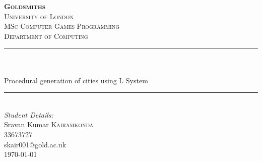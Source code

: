 \begin{titlepage}

\newcommand{\HRule}{\rule{\linewidth}{0.5mm}} %

\center %

\vspace*{\fill}\begin{center}
 
\textsc{\Huge \textbf {Goldsmiths}}\\ %
\textsc{\small University of London}\\[1.5cm] %
\textsc{\Large MSc Computer Games Programming}\\[0.5cm] %
\textsc{\large Department of Computing}\\[0.5cm] %

\makeatletter
\HRule \\[0.4cm]
{ \huge \bfseries \@title}\\[0.1cm] \large Procedural generation of cities using L System
\HRule \\[1.5cm]
 
\Large \emph{Student Details:}\\ [0.2cm]
\large Sravan Kumar \textsc{Kairamkonda}\\[0.2cm]
\large 33673727\\[0.2cm]
\large skair001@gold.ac.uk\\[2cm] %



{\large \today}\\[2cm] %


\end{center}\vspace*{\fill}
\end{titlepage}